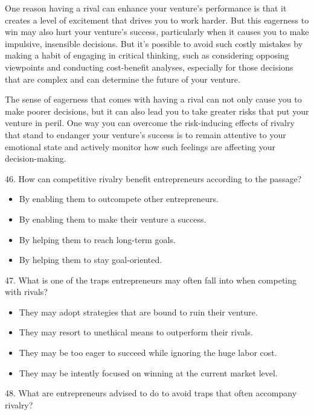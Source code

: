 \documentclass[UTF8,11pt]{ctexart}
\begin{document}
One reason having a rival can enhance your venture’s performance is that it creates a level of excitement that drives you to work harder. But this eagerness to win may also hurt your venture’s success, particularly when it causes you to make impulsive, insensible decisions. But it’s possible to avoid such costly mistakes by making a habit of engaging in critical thinking, such as considering opposing viewpoints and conducting cost-benefit analyses, especially for those decisions that are complex and can determine the future of your venture.


The sense of eagerness that comes with having a rival can not only cause you to make poorer decisions, but it can also lead you to take greater risks that put your venture in peril. One way you can overcome the risk-inducing effects of rivalry that stand to endanger your venture’s success is to remain attentive to your emotional state and actively monitor how such feelings are affecting your decision-making.


46. How can competitive rivalry benefit entrepreneurs according to the passage?


\begin{itemize}[leftmargin=2em,itemsep=.2em,topsep=.4em]\item[A.] By enabling them to outcompete other entrepreneurs.
\item[B.] By enabling them to make their venture a success.
\item[C.] By helping them to reach long-term goals.
\item[D.] By helping them to stay goal-oriented.
\end{itemize}

47. What is one of the traps entrepreneurs may often fall into when competing with rivals?


\begin{itemize}[leftmargin=2em,itemsep=.2em,topsep=.4em]\item[A.] They may adopt strategies that are bound to ruin their venture.
\item[B.] They may resort to unethical means to outperform their rivals.
\item[C.] They may be too eager to succeed while ignoring the huge labor cost.
\item[D.] They may be intently focused on winning at the current market level.
\end{itemize}

48. What are entrepreneurs advised to do to avoid traps that often accompany rivalry?
\end{document}
